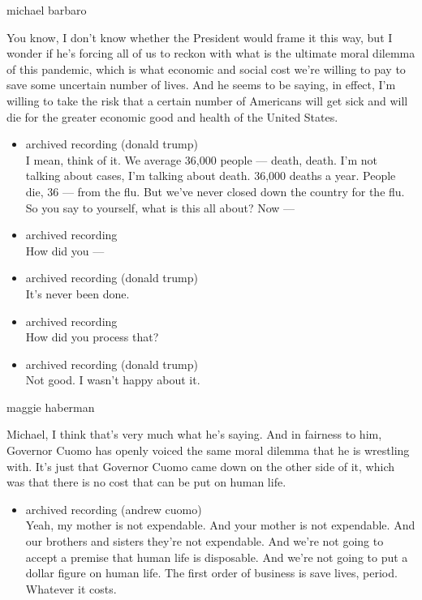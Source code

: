 michael barbaro

You know, I don't know whether the President would frame it this way,
but I wonder if he's forcing all of us to reckon with what is the
ultimate moral dilemma of this pandemic, which is what economic and
social cost we're willing to pay to save some uncertain number of lives.
And he seems to be saying, in effect, I'm willing to take the risk that
a certain number of Americans will get sick and will die for the greater
economic good and health of the United States.

\begin{itemize}
\item
  archived recording (donald trump)\\
  I mean, think of it. We average 36,000 people --- death, death. I'm
  not talking about cases, I'm talking about death. 36,000 deaths a
  year. People die, 36 --- from the flu. But we've never closed down the
  country for the flu. So you say to yourself, what is this all about?
  Now ---
\item
  archived recording\\
  How did you ---
\item
  archived recording (donald trump)\\
  It's never been done.
\item
  archived recording\\
  How did you process that?
\item
  archived recording (donald trump)\\
  Not good. I wasn't happy about it.
\end{itemize}

maggie haberman

Michael, I think that's very much what he's saying. And in fairness to
him, Governor Cuomo has openly voiced the same moral dilemma that he is
wrestling with. It's just that Governor Cuomo came down on the other
side of it, which was that there is no cost that can be put on human
life.

\begin{itemize}
\tightlist
\item
  archived recording (andrew cuomo)\\
  Yeah, my mother is not expendable. And your mother is not expendable.
  And our brothers and sisters they're not expendable. And we're not
  going to accept a premise that human life is disposable. And we're not
  going to put a dollar figure on human life. The first order of
  business is save lives, period. Whatever it costs.
\end{itemize}

